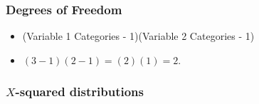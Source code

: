 \documentclass{beamer}
\begin{document}
\begin{frame}
  \frametitle{Degrees of Freedom}
  \begin{itemize}
    \item[] 
      (Variable 1 Categories - 1)(Variable 2 Categories - 1) 
      \vspace{0.5cm}
    \item[] 
      $(3-1)(2-1) = (2)(1) = 2$.
  \end{itemize}
\end{frame}

\begin{frame}
  \frametitle{$X$-squared distributions}
\end{frame}
\end{document}
